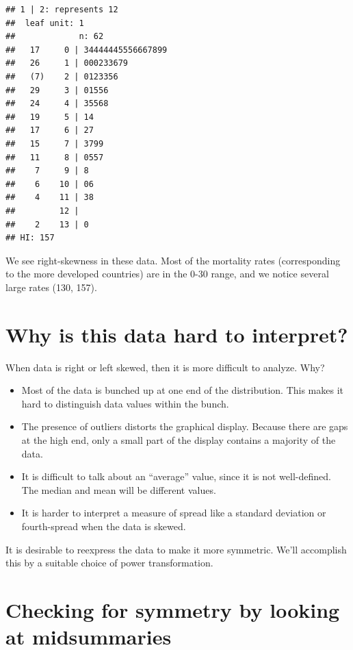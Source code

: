 \documentclass[
]{book}
\providecommand{\tightlist}{%
  \setlength{\itemsep}{0pt}\setlength{\parskip}{0pt}}
\begin{document}
\begin{verbatim}
## 1 | 2: represents 12
##  leaf unit: 1
##             n: 62
##   17     0 | 34444445556667899
##   26     1 | 000233679
##   (7)    2 | 0123356
##   29     3 | 01556
##   24     4 | 35568
##   19     5 | 14
##   17     6 | 27
##   15     7 | 3799
##   11     8 | 0557
##    7     9 | 8
##    6    10 | 06
##    4    11 | 38
##         12 | 
##    2    13 | 0
## HI: 157
\end{verbatim}

We see right-skewness in these data. Most of the mortality rates (corresponding to the more developed countries) are in the 0-30 range, and we notice several large rates (130, 157).

\hypertarget{why-is-this-data-hard-to-interpret}{%
\section{Why is this data hard to interpret?}\label{why-is-this-data-hard-to-interpret}}

When data is right or left skewed, then it is more difficult to analyze. Why?

\begin{itemize}
\tightlist
\item
  Most of the data is bunched up at one end of the distribution. This makes it hard to distinguish data values within the bunch.
\item
  The presence of outliers distorts the graphical display. Because there are gaps at the high end, only a small part of the display contains a majority of the data.
\item
  It is difficult to talk about an ``average'' value, since it is not well-defined. The median and mean will be different values.\\
\item
  It is harder to interpret a measure of spread like a standard deviation or fourth-spread when the data is skewed.
\end{itemize}

It is desirable to reexpress the data to make it more symmetric. We'll accomplish this by a suitable choice of power transformation.

\hypertarget{checking-for-symmetry-by-looking-at-midsummaries}{%
\section{Checking for symmetry by looking at midsummaries}\label{checking-for-symmetry-by-looking-at-midsummaries}}
\end{document}
